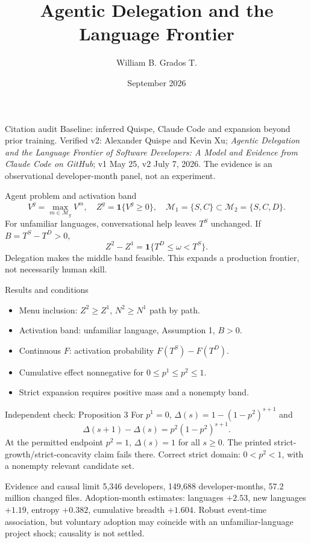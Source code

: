 \documentclass[aspectratio=169]{beamer}
\title{Agentic Delegation and the Language Frontier}
\author{William B. Grados T.}
\institute{\url{https://github.com/wbgradost/ai-03-quispe}}
\date{September 2026}
\begin{document}
\begin{frame}\titlepage\end{frame}
\begin{frame}{Citation audit}
\small Baseline: inferred Quispe, Claude Code and expansion beyond prior training. Verified v2: Alexander Quispe and Kevin Xu; \emph{Agentic Delegation and the Language Frontier of Software Developers: A Model and Evidence from Claude Code on GitHub}; v1 May 25, v2 July 7, 2026. The evidence is an observational developer-month panel, not an experiment.
\end{frame}
\begin{frame}{Agent problem and activation band}
\[V^g=\max_{m\in\mathcal M_g}V^m,\quad Z^g=\mathbf 1\{V^g\ge0\},\quad \mathcal M_1=\{S,C\}\subset\mathcal M_2=\{S,C,D\}.\]
For unfamiliar languages, conversational help leaves $T^S$ unchanged. If $B=T^S-T^D>0$,
\[Z^2-Z^1=\mathbf 1\{T^D\le\omega<T^S\}.\]
Delegation makes the middle band feasible. This expands a production frontier, not necessarily human skill.
\end{frame}
\begin{frame}{Results and conditions}
\begin{itemize}
\item Menu inclusion: $Z^2\ge Z^1$, $N^2\ge N^1$ path by path.
\item Activation band: unfamiliar language, Assumption 1, $B>0$.
\item Continuous $F$: activation probability $F(T^S)-F(T^D)$.
\item Cumulative effect nonnegative for $0\le p^1\le p^2\le1$.
\item Strict expansion requires positive mass and a nonempty band.
\end{itemize}
\end{frame}
\begin{frame}{Independent check: Proposition 3}
For $p^1=0$, $\Delta(s)=1-(1-p^2)^{s+1}$ and
\[\Delta(s+1)-\Delta(s)=p^2(1-p^2)^{s+1}.\]
At the permitted endpoint $p^2=1$, $\Delta(s)=1$ for all $s\ge0$. The printed strict-growth/strict-concavity claim fails there. Correct strict domain: $0<p^2<1$, with a nonempty relevant candidate set.
\end{frame}
\begin{frame}{Evidence and causal limit}
5,346 developers, 149,688 developer-months, 57.2 million changed files. Adoption-month estimates: languages $+2.53$, new languages $+1.19$, entropy $+0.382$, cumulative breadth $+1.604$. Robust event-time association, but voluntary adoption may coincide with an unfamiliar-language project shock; causality is not settled.
\end{frame}
\end{document}
